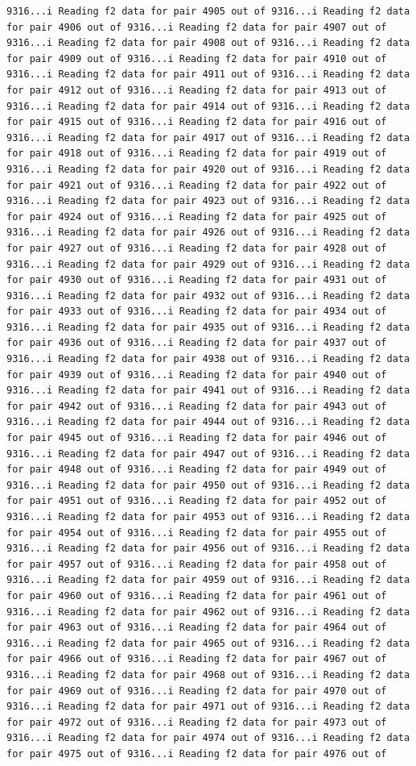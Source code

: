 \documentclass[
]{article}
\begin{document}
\begin{verbatim}
9316...i Reading f2 data for pair 4905 out of 9316...i Reading f2 data for pair 4906 out of 9316...i Reading f2 data for pair 4907 out of 9316...i Reading f2 data for pair 4908 out of 9316...i Reading f2 data for pair 4909 out of 9316...i Reading f2 data for pair 4910 out of 9316...i Reading f2 data for pair 4911 out of 9316...i Reading f2 data for pair 4912 out of 9316...i Reading f2 data for pair 4913 out of 9316...i Reading f2 data for pair 4914 out of 9316...i Reading f2 data for pair 4915 out of 9316...i Reading f2 data for pair 4916 out of 9316...i Reading f2 data for pair 4917 out of 9316...i Reading f2 data for pair 4918 out of 9316...i Reading f2 data for pair 4919 out of 9316...i Reading f2 data for pair 4920 out of 9316...i Reading f2 data for pair 4921 out of 9316...i Reading f2 data for pair 4922 out of 9316...i Reading f2 data for pair 4923 out of 9316...i Reading f2 data for pair 4924 out of 9316...i Reading f2 data for pair 4925 out of 9316...i Reading f2 data for pair 4926 out of 9316...i Reading f2 data for pair 4927 out of 9316...i Reading f2 data for pair 4928 out of 9316...i Reading f2 data for pair 4929 out of 9316...i Reading f2 data for pair 4930 out of 9316...i Reading f2 data for pair 4931 out of 9316...i Reading f2 data for pair 4932 out of 9316...i Reading f2 data for pair 4933 out of 9316...i Reading f2 data for pair 4934 out of 9316...i Reading f2 data for pair 4935 out of 9316...i Reading f2 data for pair 4936 out of 9316...i Reading f2 data for pair 4937 out of 9316...i Reading f2 data for pair 4938 out of 9316...i Reading f2 data for pair 4939 out of 9316...i Reading f2 data for pair 4940 out of 9316...i Reading f2 data for pair 4941 out of 9316...i Reading f2 data for pair 4942 out of 9316...i Reading f2 data for pair 4943 out of 9316...i Reading f2 data for pair 4944 out of 9316...i Reading f2 data for pair 4945 out of 9316...i Reading f2 data for pair 4946 out of 9316...i Reading f2 data for pair 4947 out of 9316...i Reading f2 data for pair 4948 out of 9316...i Reading f2 data for pair 4949 out of 9316...i Reading f2 data for pair 4950 out of 9316...i Reading f2 data for pair 4951 out of 9316...i Reading f2 data for pair 4952 out of 9316...i Reading f2 data for pair 4953 out of 9316...i Reading f2 data for pair 4954 out of 9316...i Reading f2 data for pair 4955 out of 9316...i Reading f2 data for pair 4956 out of 9316...i Reading f2 data for pair 4957 out of 9316...i Reading f2 data for pair 4958 out of 9316...i Reading f2 data for pair 4959 out of 9316...i Reading f2 data for pair 4960 out of 9316...i Reading f2 data for pair 4961 out of 9316...i Reading f2 data for pair 4962 out of 9316...i Reading f2 data for pair 4963 out of 9316...i Reading f2 data for pair 4964 out of 9316...i Reading f2 data for pair 4965 out of 9316...i Reading f2 data for pair 4966 out of 9316...i Reading f2 data for pair 4967 out of 9316...i Reading f2 data for pair 4968 out of 9316...i Reading f2 data for pair 4969 out of 9316...i Reading f2 data for pair 4970 out of 9316...i Reading f2 data for pair 4971 out of 9316...i Reading f2 data for pair 4972 out of 9316...i Reading f2 data for pair 4973 out of 9316...i Reading f2 data for pair 4974 out of 9316...i Reading f2 data for pair 4975 out of 9316...i Reading f2 data for pair 4976 out of 
\end{verbatim}
\end{document}
